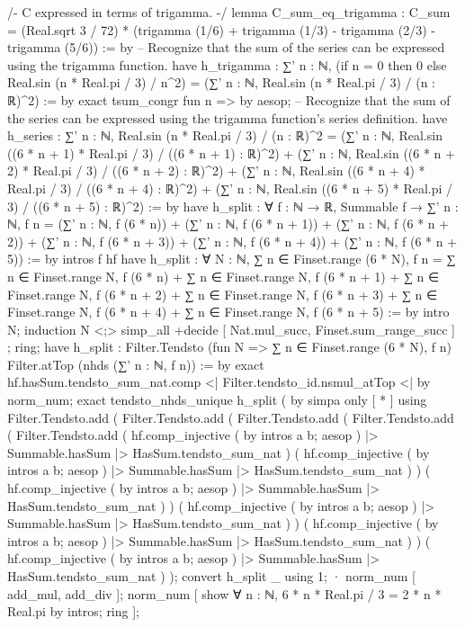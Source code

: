 {/-
C expressed in terms of trigamma.
-/
lemma C_sum_eq_trigamma : C_sum = (Real.sqrt 3 / 72) * (trigamma (1/6) + trigamma (1/3) - trigamma (2/3) - trigamma (5/6)) := by
  -- Recognize that the sum of the series can be expressed using the trigamma function.
  have h_trigamma : ∑' n : ℕ, (if n = 0 then 0 else Real.sin (n * Real.pi / 3) / n^2) = (∑' n : ℕ, Real.sin (n * Real.pi / 3) / (n : ℝ)^2) := by
    exact tsum_congr fun n => by aesop;
  -- Recognize that the sum of the series can be expressed using the trigamma function's series definition.
  have h_series : ∑' n : ℕ, Real.sin (n * Real.pi / 3) / (n : ℝ)^2 = (∑' n : ℕ, Real.sin ((6 * n + 1) * Real.pi / 3) / ((6 * n + 1) : ℝ)^2) + (∑' n : ℕ, Real.sin ((6 * n + 2) * Real.pi / 3) / ((6 * n + 2) : ℝ)^2) + (∑' n : ℕ, Real.sin ((6 * n + 4) * Real.pi / 3) / ((6 * n + 4) : ℝ)^2) + (∑' n : ℕ, Real.sin ((6 * n + 5) * Real.pi / 3) / ((6 * n + 5) : ℝ)^2) := by
    have h_split : ∀ {f : ℕ → ℝ}, Summable f → ∑' n : ℕ, f n = (∑' n : ℕ, f (6 * n)) + (∑' n : ℕ, f (6 * n + 1)) + (∑' n : ℕ, f (6 * n + 2)) + (∑' n : ℕ, f (6 * n + 3)) + (∑' n : ℕ, f (6 * n + 4)) + (∑' n : ℕ, f (6 * n + 5)) := by
      intros f hf
      have h_split : ∀ N : ℕ, ∑ n ∈ Finset.range (6 * N), f n = ∑ n ∈ Finset.range N, f (6 * n) + ∑ n ∈ Finset.range N, f (6 * n + 1) + ∑ n ∈ Finset.range N, f (6 * n + 2) + ∑ n ∈ Finset.range N, f (6 * n + 3) + ∑ n ∈ Finset.range N, f (6 * n + 4) + ∑ n ∈ Finset.range N, f (6 * n + 5) := by
        intro N; induction N <;> simp_all +decide [ Nat.mul_succ, Finset.sum_range_succ ] ; ring;
      have h_split : Filter.Tendsto (fun N => ∑ n ∈ Finset.range (6 * N), f n) Filter.atTop (nhds (∑' n : ℕ, f n)) := by
        exact hf.hasSum.tendsto_sum_nat.comp <| Filter.tendsto_id.nsmul_atTop <| by norm_num;
      exact tendsto_nhds_unique h_split ( by simpa only [ * ] using Filter.Tendsto.add ( Filter.Tendsto.add ( Filter.Tendsto.add ( Filter.Tendsto.add ( Filter.Tendsto.add ( hf.comp_injective ( by intros a b; aesop ) |> Summable.hasSum |> HasSum.tendsto_sum_nat ) ( hf.comp_injective ( by intros a b; aesop ) |> Summable.hasSum |> HasSum.tendsto_sum_nat ) ) ( hf.comp_injective ( by intros a b; aesop ) |> Summable.hasSum |> HasSum.tendsto_sum_nat ) ) ( hf.comp_injective ( by intros a b; aesop ) |> Summable.hasSum |> HasSum.tendsto_sum_nat ) ) ( hf.comp_injective ( by intros a b; aesop ) |> Summable.hasSum |> HasSum.tendsto_sum_nat ) ) ( hf.comp_injective ( by intros a b; aesop ) |> Summable.hasSum |> HasSum.tendsto_sum_nat ) );
    convert h_split _ using 1;
    · norm_num [ add_mul, add_div ];
      norm_num [ show ∀ n : ℕ, 6 * n * Real.pi / 3 = 2 * n * Real.pi by intros; ring ];
}
